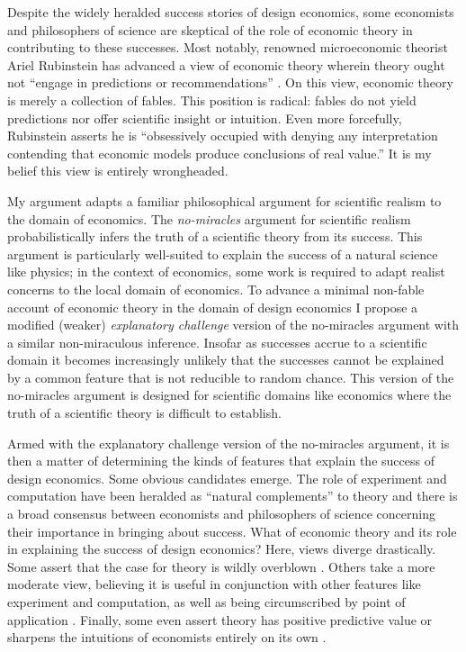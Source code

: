 Despite the widely heralded success stories of design economics, some economists and philosophers of science are skeptical of the role of economic theory in contributing to these successes. Most notably, renowned microeconomic theorist Ariel Rubinstein has advanced a view of economic theory wherein theory ought not ``engage in predictions or recommendations'' \autocite[36]{rubinstein2012}. On this view, economic theory is merely a collection of fables. This position is radical: fables do not yield predictions nor offer scientific insight or intuition. Even more forcefully, Rubinstein \autocite*[37]{rubinstein2012} asserts he is ``obsessively occupied with denying any interpretation contending that economic models produce conclusions of real value.'' It is my belief this view is entirely wrongheaded.

My argument adapts a familiar philosophical argument for scientific realism to the domain of economics. The \textit{no-miracles} argument for scientific realism \autocite{putnam1975} probabilistically infers the truth of a scientific theory from its success. This argument is particularly well-suited to explain the success of a natural science like physics; in the context of economics, some work is required to adapt realist concerns to the local domain of economics. To advance a minimal non-fable account of economic theory in the domain of design economics I propose a modified (weaker) \textit{explanatory challenge} version of the no-miracles argument with a similar non-miraculous inference. Insofar as successes accrue to a scientific domain it becomes increasingly unlikely that the successes cannot be explained by a common feature that is not reducible to random chance. This version of the no-miracles argument is designed for scientific domains like economics where the truth of a scientific theory is difficult to establish.

Armed with the explanatory challenge version of the no-miracles argument, it is then a matter of determining the kinds of features that explain the success of design economics. Some obvious candidates emerge. The role of experiment and computation have been heralded as ``natural complements'' \autocite[1342]{roth2002} to theory and there is a broad consensus between economists and philosophers of science concerning their importance in bringing about success. What of economic theory and its role in explaining the success of design economics? Here, views diverge drastically. Some assert that the case for theory is wildly overblown \autocite{nikkhah2008,rubinstein2012}. Others take a more moderate view, believing it is useful in conjunction with other features like experiment and computation, as well as being circumscribed by point of application \autocite{alexandrova2009}. Finally, some even assert theory has positive predictive value or sharpens the intuitions of economists entirely on its own \autocite{roth2019}. 

